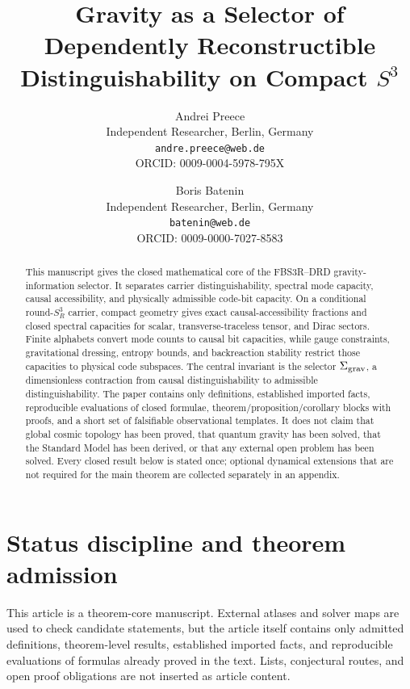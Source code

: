 \documentclass[11pt,a4paper]{article}
\title{Gravity as a Selector of Dependently Reconstructible Distinguishability on Compact $S^3$}
\author{%
Andrei Preece\\[-0.15em]\small Independent Researcher, Berlin, Germany\\[-0.15em]\small \texttt{andre.preece@web.de}\\[-0.15em]\small ORCID: 0009-0004-5978-795X
\and
Boris Batenin\\[-0.15em]\small Independent Researcher, Berlin, Germany\\[-0.15em]\small \texttt{batenin@web.de}\\[-0.15em]\small ORCID: 0009-0000-7027-8583
}
\date{}
\begin{document}
\maketitle

\begin{abstract}
This manuscript gives the closed mathematical core of the FBS3R--DRD gravity-information selector.  It separates carrier distinguishability, spectral mode capacity, causal accessibility, and physically admissible code-bit capacity.  On a conditional round-$S^3_R$ carrier, compact geometry gives exact causal-accessibility fractions and closed spectral capacities for scalar, transverse-traceless tensor, and Dirac sectors.  Finite alphabets convert mode counts to causal bit capacities, while gauge constraints, gravitational dressing, entropy bounds, and backreaction stability restrict those capacities to physical code subspaces.  The central invariant is the selector $\Sigma_{\rm grav}$, a dimensionless contraction from causal distinguishability to admissible distinguishability.  The paper contains only definitions, established imported facts, reproducible evaluations of closed formulae, theorem/proposition/corollary blocks with proofs, and a short set of falsifiable observational templates.  It does not claim that global cosmic topology has been proved, that quantum gravity has been solved, that the Standard Model has been derived, or that any external open problem has been solved.  Every closed result below is stated once; optional dynamical extensions that are not required for the main theorem are collected separately in an appendix.
\end{abstract}

\tableofcontents

\section{Status discipline and theorem admission}

This article is a theorem-core manuscript.  External atlases and solver maps are used to check candidate statements, but the article itself contains only admitted definitions, theorem-level results, established imported facts, and reproducible evaluations of formulas already proved in the text.  Lists, conjectural routes, and open proof obligations are not inserted as article content.
\end{document}
